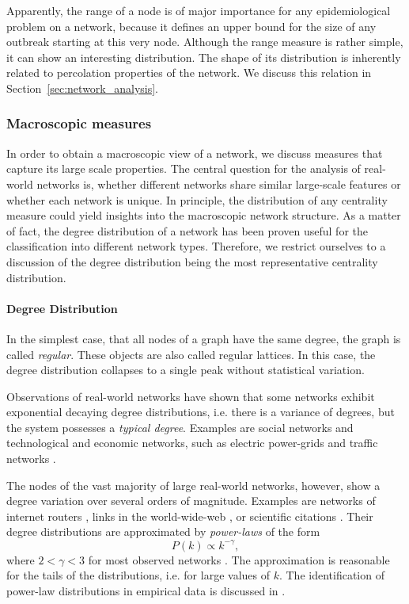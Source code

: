 Apparently, the range of a node is of major importance for any epidemiological problem on a network, because it defines an upper bound for the size of any outbreak starting at this very node. 
Although the range measure is rather simple, it can show an interesting distribution.
The shape of its distribution is inherently related to percolation properties of the network.
We discuss this relation in Section~\ref{sec:network_analysis}.

\subsubsection{Macroscopic measures}\label{sec:macro_measures}
In order to obtain a macroscopic view of a network, we discuss measures that capture its large scale properties.
The central question for the analysis of real-world networks is, whether different networks share similar large-scale features or whether each network is unique.
In principle, the distribution of any centrality measure could yield insights into the macroscopic network structure.
As a matter of fact, the degree distribution of a network has been proven useful for the classification into different network types.
Therefore, we restrict ourselves to a discussion of the degree distribution being the most representative centrality distribution.

\paragraph{Degree Distribution\color{Cayenne}{.}}
In the simplest case, that all nodes of a graph have the same degree, the graph is called \emph{regular}.
These objects are also called regular lattices.
In this case, the degree distribution collapses to a single peak without statistical variation.

Observations of real-world networks have shown that some networks exhibit exponential decaying degree distributions, i.e. there is a variance of degrees, but the system possesses a \emph{typical degree}.
Examples are social networks and technological and economic networks, such as electric power-grids and traffic networks \citep{Amaral:2000,indian_railway}.

The nodes of the vast majority of large real-world networks, however, show a degree variation over several orders of magnitude.
Examples are networks of internet routers \citep{Faloutsos:1999}, links in the world-wide-web \citep{Barabasi99}, or scientific citations \citep{Price:1965}.
Their degree distributions are approximated by \emph{power-laws} of the form
\begin{equation}\label{eq:scale-free_distr}
P(k) \propto k^{-\gamma } ,
\end{equation}
where $2<\gamma <3$ for most observed networks \citep{all_scale_free_are_sparse,Newman2003}.
The approximation is reasonable for the tails of the distributions, i.e. for large values of $k$.
The identification of power-law distributions in empirical data is discussed in \citep{Clauset:2009}.

